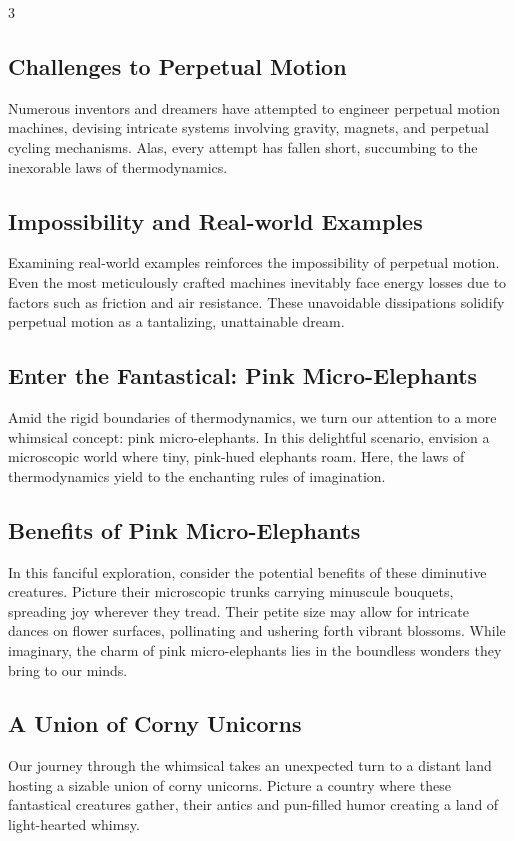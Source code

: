 \documentclass[
  t,%
]{_style/tudelft-beamerposter}
\begin{document}
\begin{frame}[fragile]
\begin{multicols}{3}
    \subsection{Challenges to Perpetual Motion}
    Numerous inventors and dreamers have attempted to engineer perpetual motion machines, devising intricate systems involving gravity, magnets, and perpetual cycling mechanisms. Alas, every attempt has fallen short, succumbing to the inexorable laws of thermodynamics.

    \subsection{Impossibility and Real-world Examples}
    Examining real-world examples reinforces the impossibility of perpetual motion. Even the most meticulously crafted machines inevitably face energy losses due to factors such as friction and air resistance. These unavoidable dissipations solidify perpetual motion as a tantalizing, unattainable dream.

    \subsection{Enter the Fantastical: Pink Micro-Elephants}
    Amid the rigid boundaries of thermodynamics, we turn our attention to a more whimsical concept: pink micro-elephants. In this delightful scenario, envision a microscopic world where tiny, pink-hued elephants roam. Here, the laws of thermodynamics yield to the enchanting rules of imagination.

    \subsection{Benefits of Pink Micro-Elephants}
    In this fanciful exploration, consider the potential benefits of these diminutive creatures. Picture their microscopic trunks carrying minuscule bouquets, spreading joy wherever they tread. Their petite size may allow for intricate dances on flower surfaces, pollinating and ushering forth vibrant blossoms. While imaginary, the charm of pink micro-elephants lies in the boundless wonders they bring to our minds.

    \subsection{A Union of Corny Unicorns}
    Our journey through the whimsical takes an unexpected turn to a distant land hosting a sizable union of corny unicorns. Picture a country where these fantastical creatures gather, their antics and pun-filled humor creating a land of light-hearted whimsy.


\end{multicols}
\end{frame}
\end{document}
